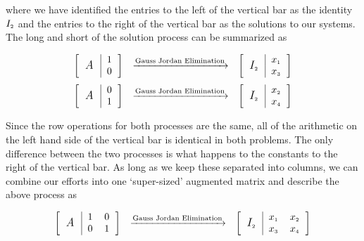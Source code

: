 where we have identified the entries to the left of the vertical bar as the identity $I_{\mbox{\tiny$2$}}$ and the entries to the right of the vertical bar as the solutions to our systems.  The long and short of the solution process can be summarized as

\[ \begin{array}{ccc}

\left[ \begin{tabular}{c|r} \multirow{2}{10pt}{\large \textit{A}} & 1 \\ & 0 \end{tabular} \right]
&
\xrightarrow{\text{Gauss Jordan Elimination}}
&
\left[ \begin{tabular}{c|r} \multirow{2}{10pt}{\large $I_{\mbox{\tiny$2$}}$} & $x_{\mbox{\tiny$1$}}$ \\ &  $x_{\mbox{\tiny$3$}}$ \end{tabular} \right]  \\ [13pt]

\left[ \begin{tabular}{c|r} \multirow{2}{10pt}{\large \textit{A}} & 0 \\ & 1 \end{tabular} \right]
&
\xrightarrow{\text{Gauss Jordan Elimination}}
&
\left[ \begin{tabular}{c|r} \multirow{2}{10pt}{\large $I_{\mbox{\tiny$2$}}$} & $x_{\mbox{\tiny$2$}}$ \\ & $x_{\mbox{\tiny$4$}}$ \end{tabular} \right]

\end{array}\]

Since the row operations for both processes are the same, all of the arithmetic on the left hand side of the vertical bar is identical in both problems.  The only difference between the two processes is what happens to the constants to the right of the vertical bar.  As long as we keep these separated into columns, we can combine our efforts into one `super-sized' augmented matrix and describe the above process as

\[ \begin{array}{ccc}

\left[ \begin{tabular}{c|rr} \multirow{2}{10pt}{\large \textit{A}} & 1 & 0 \\ & 0 & 1 \end{tabular} \right]
&
\xrightarrow{\text{Gauss Jordan Elimination}}
&
\left[ \begin{tabular}{c|rr} \multirow{2}{10pt}{\large $I_{\mbox{\tiny$2$}}$} & $x_{\mbox{\tiny$1$}}$ & $x_{\mbox{\tiny$2$}}$ \\ &  $x_{\mbox{\tiny$3$}}$ & $x_{\mbox{\tiny$4$}}$ \end{tabular} \right]

\end{array}\]

